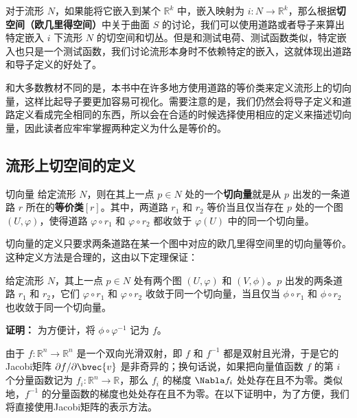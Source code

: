 



对于流形 $N$，如果能将它嵌入到某个 $\mathbb{R}^k$ 中，嵌入映射为 $i:N\rightarrow\mathbb{R}^k$，那么根据\textbf{切空间（欧几里得空间）}中关于曲面 $S$ 的讨论，我们可以使用道路或者导子来算出特定嵌入 $i$ 下流形 $N$ 的切空间和切丛。但是和测试电荷、测试函数类似，特定嵌入也只是一个测试函数，我们讨论流形本身时不依赖特定的嵌入，这就体现出道路和导子定义的好处了。

和大多数教材不同的是，本书中在许多地方使用道路的等价类来定义流形上的切向量，这样比起导子要更加容易可视化。需要注意的是，我们仍然会将导子定义和道路定义看成完全相同的东西，所以会在合适的时候选择使用相应的定义来描述切向量，因此读者应牢牢掌握两种定义为什么是等价的。

\subsection{流形上切空间的定义}

\begin{definition}{切向量}
给定流形 $N$，则在其上一点 $p\in N$ 处的一个\textbf{切向量}就是从 $p$ 出发的一条道路 $r$ 所在的\textbf{等价类}$[r]$。其中，两道路 $r_1$ 和 $r_2$ 等价当且仅当存在 $p$ 处的一个图 $(U, \varphi)$，使得道路 $\varphi\circ r_1$ 和 $\varphi\circ r_2$ 都收敛于 $\varphi(U)$ 中的同一个切向量。
\end{definition}

切向量的定义只要求两条道路在某一个图中对应的欧几里得空间里的切向量等价。这种定义方法是合理的，这由以下定理保证：

\begin{theorem}{}\label{the_tgSpa_1}
给定流形 $N$，其上一点 $p\in N$ 处有两个图 $(U, \varphi)$ 和 $(V, \phi)$。$p$ 出发的两条道路 $r_1$ 和 $r_2$，它们 $\varphi\circ r_1$ 和 $\varphi\circ r_2$ 收敛于同一个切向量，当且仅当 $\phi\circ r_1$ 和 $\phi\circ r_2$ 也收敛于同一个切向量。
\end{theorem}

\textbf{证明：}
为方便计，将 $\phi\circ\varphi^{-1}$ 记为 $f$。

由于 $f:\mathbb{R}^n\rightarrow\mathbb{R}^n$ 是一个双向光滑双射，即 $f$ 和 $f^{-1}$ 都是双射且光滑，于是它的Jacobi矩阵 $\partial f/\partial \bvec{v}$ 是非奇异的；换句话说，如果把向量值函数 $f$ 的第 $i$ 个分量函数记为 $f_i:\mathbb{R}^n\rightarrow\mathbb{R}$，那么 $f_i$ 的梯度 $\Nabla f_i$ 处处存在且不为零。类似地，$f^{-1}$ 的分量函数的梯度也处处存在且不为零。在以下证明中，为了方便，我们将直接使用Jacobi矩阵的表示方法。

